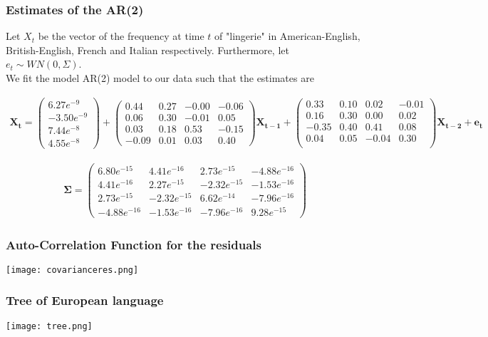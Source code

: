 \documentclass[10pt]{beamer}
\begin{document}
\begin{frame}
\frametitle{Estimates of the AR(2)}
Let $X_t$ be the vector of the frequency at time $t$ of "lingerie" in American-English, British-English, French and Italian respectively. Furthermore, let $e_t \sim WN(0,\Sigma)$. \\
We fit the model AR(2) model to our data such that the estimates are


\begin{tiny}
\begin{align*}
\pmb{X_t}=
\begin{pmatrix}
6.27e^{-9} \\
-3.50e^{-9} \\
 7.44e^{-8} \\
 4.55e^{-8}
\end{pmatrix}
+
\begin{pmatrix}
 0.44 & 0.27 & -0.00 & -0.06  \\
 0.06 & 0.30 & -0.01 & 0.05  \\
 0.03 & 0.18 & 0.53 & -0.15 \\
 -0.09 & 0.01 & 0.03 & 0.40
\end{pmatrix}
\pmb{X_{t-1}}+
\begin{pmatrix}
0.33 & 0.10 & 0.02  & -0.01 \\
 0.16 &  0.30 & 0.00 & 0.02 \\
 -0.35 & 0.40 & 0.41 & 0.08 \\
 0.04 & 0.05 & -0.04 & 0.30 \\ 
\end{pmatrix}
\pmb{X_{t-2}}
+
\pmb{e_{t}}
\end{align*}
\end{tiny}

\begin{tiny}
\begin{align*}
\pmb{\Sigma}=
\begin{pmatrix}
6.80e^{-15} & 4.41e^{-16} & 2.73e^{-15} & -4.88e^{-16} \\
 4.41e^{-16} & 2.27e^{-15} & -2.32e^{-15} & -1.53e^{-16} \\
 2.73e^{-15} & -2.32e^{-15} & 6.62e^{-14} & -7.96e^{-16} \\
 -4.88e^{-16} & -1.53e^{-16} & -7.96e^{-16} & 9.28e^{-15}
\end{pmatrix}
\end{align*}
\end{tiny}
\end{frame}

\begin{frame}
\frametitle{Auto-Correlation Function for the residuals}
	\begin{center}
       \texttt{[image: covarianceres.png]}
	\end{center}
\end{frame}


\begin{frame}
\frametitle{Tree of European language}
	\begin{center}
       \texttt{[image: tree.png]}
	\end{center}
\end{frame}
\end{document}
